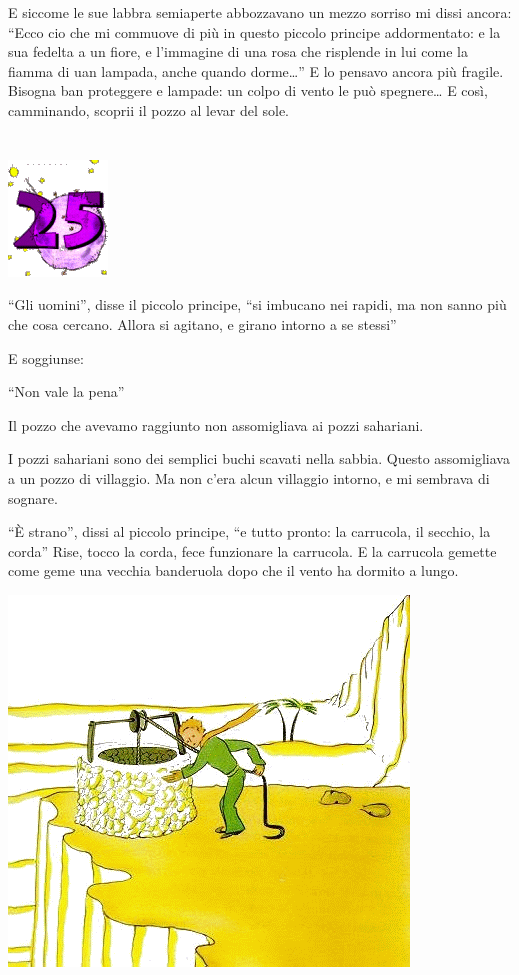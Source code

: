\documentclass[11pt]{scrbook}
\begin{document}
E siccome le sue labbra semiaperte abbozzavano un mezzo sorriso mi dissi
ancora: ``Ecco cio che mi commuove di più in questo piccolo principe
addormentato: e la sua fedelta a un fiore, e l'immagine di una rosa che
risplende in lui come la fiamma di uan lampada, anche quando
dorme\ldots{}'' E lo pensavo ancora più fragile. Bisogna ban proteggere
e lampade: un colpo di vento le può spegnere\ldots{} E così, camminando,
scoprii il pozzo al levar del sole.

\chapter{}
\begin{center}
\includegraphics{img/chapter25}
\end{center}

``Gli uomini'', disse il piccolo principe, ``si imbucano nei rapidi, ma
non sanno più che cosa cercano. Allora si agitano, e girano intorno a se
stessi''

E soggiunse:

``Non vale la pena''

Il pozzo che avevamo raggiunto non assomigliava ai pozzi sahariani.

I pozzi sahariani sono dei semplici buchi scavati nella sabbia. Questo
assomigliava a un pozzo di villaggio. Ma non c'era alcun villaggio
intorno, e mi sembrava di sognare.

``È strano'', dissi al piccolo principe, ``e tutto pronto: la carrucola,
il secchio, la corda'' Rise, tocco la corda, fece funzionare la
carrucola. E la carrucola gemette come geme una vecchia banderuola dopo
che il vento ha dormito a lungo.

\begin{center}
\includegraphics{img/25a}
\end{center}
\end{document}

